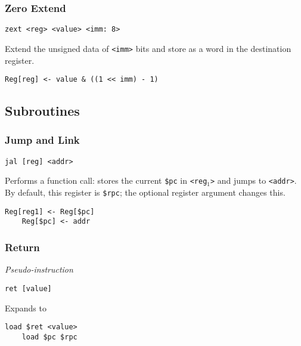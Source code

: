 \subsubsection{Zero Extend}

\begin{lstlisting}[style=assembly]
    zext <reg> <value> <imm: 8>
\end{lstlisting}

Extend the unsigned data of \texttt{<imm>} bits and store as a word in the destination register.

\begin{lstlisting}[style=rtn,mathescape]
    Reg[reg] <- value & ((1 << imm) - 1)
\end{lstlisting}

\subsection{Subroutines}

\subsubsection{Jump and Link}

\begin{lstlisting}[style=assembly]
    jal [reg] <addr>
\end{lstlisting}

Performs a function call: stores the current \texttt{\$pc} in \texttt{<reg$_1$>} and jumps to \texttt{<addr>}.
By default, this register is \texttt{\$rpc}; the optional register argument changes this.

\begin{lstlisting}[style=rtn]
    Reg[reg1] <- Reg[$pc]
    Reg[$pc] <- addr
\end{lstlisting}

\subsubsection{Return}

\textit{Pseudo-instruction}

\begin{lstlisting}[style=assembly]
    ret [value]
\end{lstlisting}

Expands to

\begin{lstlisting}[style=assembly]
    load $ret <value>
    load $pc $rpc
\end{lstlisting}

